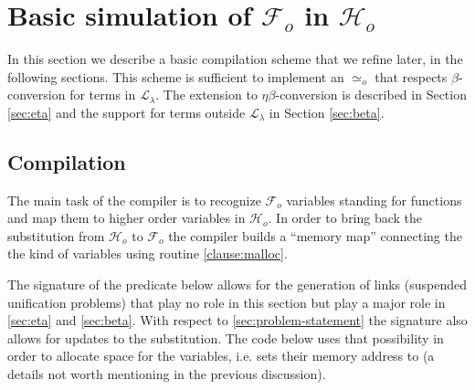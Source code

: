 \documentclass[sigconf,natbib=false,review]{acmart}
\newcommand{\UnifRel}{\ensuremath{\simeq}}
\newcommand{\Uo}{\ensuremath{\UnifRel_o}\xspace}
\newcommand{\llambda}{\ensuremath{\mathcal{L}_\lambda}\xspace}
\newcommand{\Fo}{\ensuremath{\mathcal{F}_{\!o}\xspace}} %
\newcommand{\Ho}{\ensuremath{\mathcal{H}_o}\xspace}
\begin{document}



\section[Compilation: fo\_tm to tm]{Basic simulation of \Fo{} in \Ho{}}
\label{sec:compilation}

In this section we describe a basic compilation scheme that we refine
later, in the following sections. This scheme is sufficient to implement
an \Uo{} that respects $\beta$-conversion for terms in \llambda. The extension to
$\eta\beta$-conversion is described in Section \ref{sec:eta} and the support
for terms outside \llambda in Section \ref{sec:beta}.

\subsection{Compilation}

The main task of the compiler is to recognize \Fo{} variables standing
for functions and map them to higher order variables in \Ho.
In order to bring back the substitution from \Ho{} to \Fo{} the compiler
builds a ``memory map'' connecting the the kind of variables using routine
\ref{clause:malloc}.

The signature of the  predicate below allows for the generation of
links (suspended unification problems) that play no role in this section
but play a major role in \cref{sec:eta} and \cref{sec:beta}.
With respect to \cref{sec:problem-statement} the signature also allows
for updates to the substitution.  The code below uses that possibility
in order to allocate space for the variables, i.e. sets their memory
address to  (a details not worth mentioning in the
previous discussion).
\end{document}
